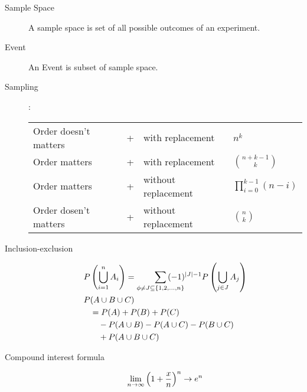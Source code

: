 \begin{slide}[Basics]
\begin{description}
	\item[Sample Space] A sample space is set of all possible outcomes of an experiment. 
	\item[Event] An Event is subset of sample space.
	\item[Sampling]:\newline
		\begin{tabular}{lcll}
			Order doesn't matters& + &with replacement& $n^k$\\
			Order matters& + &with replacement& ${n+k-1\choose k}$\\
			Order matters& + &without replacement& $ \prod\limits_{i=0}^{k-1}(n-i)$\\
			Order dosen't matters& + &without replacement& ${n\choose k}$
		\end{tabular}
\end{description}
\end{slide}


\begin{slidemaximus}
\begin{description}
\item[Inclusion-exclusion]
\begin{align*}
P&\left(\bigcup_{i=1}^{n} A_i\right) =\sum_{\phi\neq J\subseteq\{1,2,\ldots,n\}}\hspace{-20pt} (-1)^{|J|-1}P\left(\bigcup_{j\in J}A_j\right)\\
  P&(A\cup B\cup C)\\ &=  P(A) + P(B) + P(C)\\
                           &\quad- P(A\cup B) - P(A\cup C) - P(B\cup C)\\
			   &\quad+ P(A\cup B\cup C)  
\end{align*}

\item[Compound interest formula]$$\lim_{n\to\infty}\left(1+{x\over n}\right)^n  \to e^n$$
\end{description}
\end{slidemaximus}
